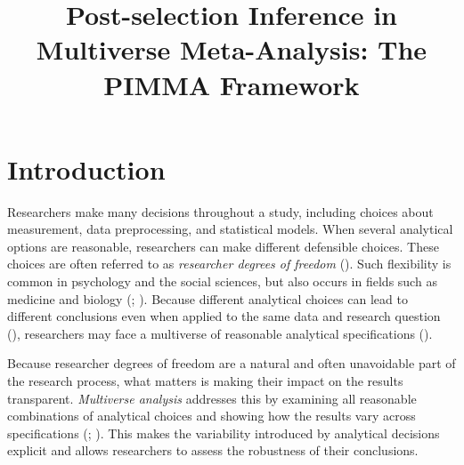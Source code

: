 \documentclass[
  man,
  longtable,
  nolmodern,
  notxfonts,
  notimes,
  colorlinks=true,linkcolor=blue,citecolor=blue,urlcolor=blue]{apa7}
\title{Post-selection Inference in Multiverse Meta-Analysis: The PIMMA
Framework}
\newlength{\cslhangindent}
\newlength{\csllabelwidth}
\begin{document}
\maketitle




\setlength\LTleft{0pt}



\ifdefined\Shaded\renewenvironment{Shaded}{\begin{snugshade}\begin{singlespace}}{\end{singlespace}\end{snugshade}}\fi


\ifdefined\cslhangindent\else\newlength{\cslhangindent}\fi
\ifdefined\csllabelwidth\else\newlength{\csllabelwidth}\fi
\setlength{\cslhangindent}{0.5in}


\section{Introduction}\label{introduction}

Researchers make many decisions throughout a study, including choices
about measurement, data preprocessing, and statistical models. When
several analytical options are reasonable, researchers can make
different defensible choices. These choices are often referred to as
\emph{researcher degrees of freedom}
(). Such flexibility
is common in psychology and the social sciences, but also occurs in
fields such as medicine and biology
(;
). Because different
analytical choices can lead to different conclusions even when applied
to the same data and research question
(), researchers
may face a multiverse of reasonable analytical specifications
().

Because researcher degrees of freedom are a natural and often
unavoidable part of the research process, what matters is making their
impact on the results transparent. \emph{Multiverse analysis} addresses
this by examining all reasonable combinations of analytical choices and
showing how the results vary across specifications
(;
). This makes the
variability introduced by analytical decisions explicit and allows
researchers to assess the robustness of their conclusions.
\end{document}
